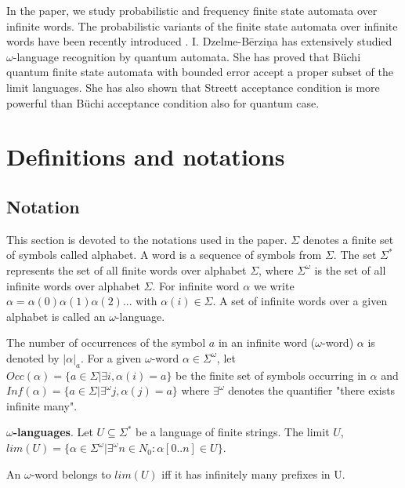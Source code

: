 \documentclass{llncs}
\begin{document}
In the paper, we study probabilistic and frequency finite state automata over infinite words. The probabilistic variants of the finite state automata over infinite words have been recently introduced \cite{BG05}. I. Dzelme-B\= erzi\c na has extensively studied $\omega$-language recognition by quantum automata. She has proved that B\"uchi quantum finite state  automata with bounded error accept a proper subset of the limit languages. She has also shown that Streett acceptance condition is more powerful than B\"uchi acceptance condition also for quantum case. 

\section{Definitions and notations}
%
\subsection{Notation}
%
This section is devoted to the notations used in the paper. $\Sigma$ denotes a finite set of symbols called alphabet. A word is a sequence of symbols from $\Sigma$. The set $\Sigma^{*}$ represents the set of all finite words over alphabet $\Sigma$, where $\Sigma^{\omega}$ is the set of all infinite words over alphabet $\Sigma$. For infinite word $\alpha$ we write $\alpha = \alpha(0) \alpha(1) \alpha(2)...$ with $\alpha(i) \in \Sigma$. A set of infinite words over a given alphabet is called an $\omega$-language.

The number of occurrences of the symbol $a$ in an infinite word ($\omega$-word) $\alpha$ is denoted by $|\alpha|_a$. For a given $\omega$-word $\alpha \in \Sigma^{\omega}$, let $Occ(\alpha)=\{a \in \Sigma | \exists i, \alpha(i) = a\}$ be the finite set of symbols occurring in $\alpha$ and $Inf(\alpha) = \{ a \in \Sigma | \exists^\omega j, \alpha(j) = a\}$  where $\exists^\omega$ denotes the quantifier "there exists infinite many".
%
\begin{definition}
\textbf{$\omega$-languages}. Let $U \subseteq \Sigma^{*}$ be a language of finite strings. The limit $U$, $lim(U) = \{\alpha \in \Sigma^{\omega} | \exists^{\omega} n \in N_0: \alpha[0..n] \in U\}$.
\end{definition}

An $\omega $-word belongs to $lim(U)$ iff it has infinitely many prefixes in U.
%
\end{document}
